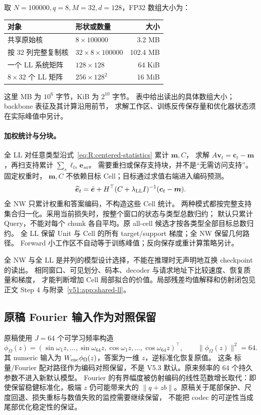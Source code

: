 \documentclass[11pt,UTF8,fontset=fandol]{ctexart}
\numberwithin{equation}{section}
\theoremstyle{definition}
\begin{document}
取 $N=100000,q=8,M=32,d=128$，FP32 数组大小为：
\begin{center}
\begin{tabularx}{\linewidth}{@{}lXr@{}}
\toprule
对象 & 形状或数量 & 大小\\
\midrule
共享原始核 & $8\times100000$ & 3.2 MB\\
按 32 列完整复制核 & $32\times8\times100000$ & 102.4 MB\\
一个 LL 系统矩阵 & $128\times128$ & 64 KiB\\
$8\times32$ 个 LL 矩阵 & $256\times128^2$ & 16 MiB\\
\bottomrule
\end{tabularx}
\end{center}
这里 MB 为 $10^6$ 字节，KiB 为 $2^{10}$ 字节。
表中给出读出的具体数组大小；backbone 表征及其计算沿用前节，
求解工作区、训练反传保存量和优化器状态须在实际峰值中另计。

\paragraph{加权统计与分块。}
全 LL 对任意类型沿式~\eqref{eq:R:centered-statistics} 累计 $\bm m,C$，
求解 $A\bm v_t=\bm c_t-\bm m$，再扫支持累计 $\sum_s\ell_{ts}\bm e_{sa}$。
需要重扫或保存支持块，并不是“无需访问支持”。固定权重时，
$\bm m,C$ 不依赖目标 Cell；目标通过求值右端进入编码预测。
\begin{equation}
 \widehat{\bm e}_t=\bar{\bm e}+H^\top(C+\lambda_{\rm LL}I)^{-1}(\bm c_t-\bm m).
 \label{eq:cost:ll-as-correction}
\end{equation}
全 NW 只累计权重和答案编码，不构造这些 Cell 统计。
两种模式都按完整支持集合归一化。采用当前损失时，按整个窗口的状态与类型总数归约；
默认只累计 Query，不能对每个 chunk 各自平均。原 all-cell 候选才按各类型全部目标总数归约。
全 LL 保留 Unit 与 Cell 的所有 target/support 梯度；全 NW 保留几何路径。
Forward 小工作区不自动等于训练峰值；反向保存或重计算策略另计。

全 NW 与全 LL 是并列的模型设计选择，不能在推理时无声明地互换 checkpoint 的读出。
相同窗口、可见划分、码本、decoder 与请求地址下比较速度、恢复质量和梯度，
才能判断增加 Cell 局部拟合的价值。局部残差均值解释和仿射闭包见正文 Step 4 与附录~\ref{v51:app:shared-ll}。

\subsection{原稿 Fourier 输入作为对照保留}
原稿使用 $J=64$ 个可学习频率构造
\begin{equation}
 \phi_\Omega(z)=(\sin\omega_1z,\ldots,\sin\omega_{64}z,
 \cos\omega_1z,\ldots,\cos\omega_{64}z)^\top,
 \qquad\|\phi_\Omega(z)\|^2=64.
 \label{eq:E:fourier}
\end{equation}
其 numeric 输入为 $W_{\rm enc}\phi_\Omega(z)$，答案为一维 $z$，逆标准化恢复原值。
这条 标量/Fourier 配对路径作为编码对照保留，不是 V5.3 默认。原来频率的 64 个持久参数不进入新默认模型。
Fourier 的有界幅度被仿射编码的线性范数增长取代：即使保留稳健标准化，极端 $z$ 仍可能带来大的
$\|q+zb\|$。原稿关于尾部保护、尺度回退、损失重标与数值失败的监控需要继续保留，
不能把 codec 的可逆性当成尾部优化稳定性的保证。
\end{document}
